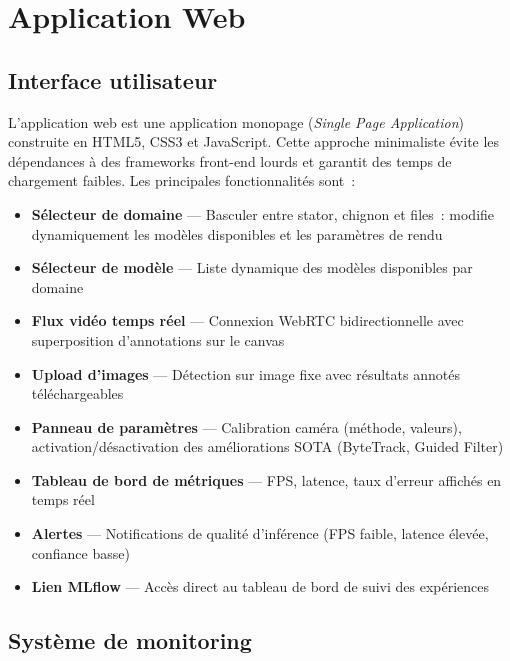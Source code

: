\documentclass[12pt,a4paper]{report}
\begin{document}
\chapter{Application Web}

\section{Interface utilisateur}

L'application web est une application monopage (\textit{Single Page Application}) construite en HTML5, CSS3 et JavaScript. Cette approche minimaliste \'evite les d\'ependances \`a des frameworks front-end lourds et garantit des temps de chargement faibles. Les principales fonctionnalit\'es sont~:

\begin{itemize}
    \item \textbf{S\'electeur de domaine} --- Basculer entre stator, chignon et files~: modifie dynamiquement les mod\`eles disponibles et les param\`etres de rendu
    \item \textbf{S\'electeur de mod\`ele} --- Liste dynamique des mod\`eles disponibles par domaine
    \item \textbf{Flux vid\'eo temps r\'eel} --- Connexion WebRTC bidirectionnelle avec superposition d'annotations sur le canvas
    \item \textbf{Upload d'images} --- D\'etection sur image fixe avec r\'esultats annot\'es t\'el\'echargeables
    \item \textbf{Panneau de param\`etres} --- Calibration cam\'era (m\'ethode, valeurs), activation/d\'esactivation des am\'eliorations SOTA (ByteTrack, Guided Filter)
    \item \textbf{Tableau de bord de m\'etriques} --- FPS, latence, taux d'erreur affich\'es en temps r\'eel
    \item \textbf{Alertes} --- Notifications de qualit\'e d'inf\'erence (FPS faible, latence \'elev\'ee, confiance basse)
    \item \textbf{Lien MLflow} --- Acc\`es direct au tableau de bord de suivi des exp\'eriences
\end{itemize}

\section{Syst\`eme de monitoring}
\end{document}
